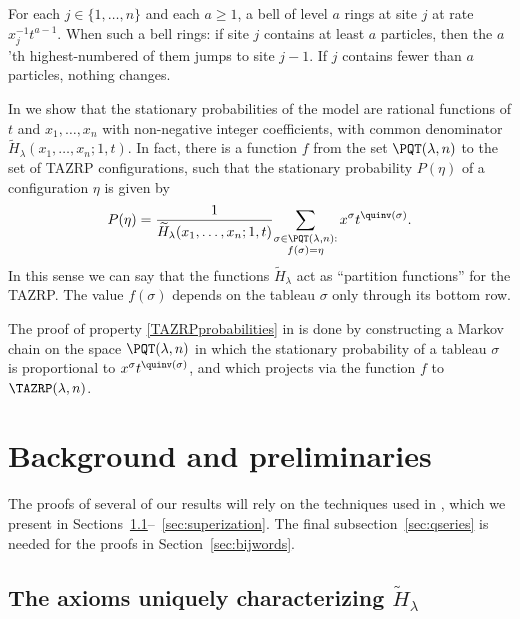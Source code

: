 For each $j\in\{1,\dots,n\}$ and each $a\geq 1$, a bell of level $a$ rings at site $j$ at rate
$x_j^{-1} t^{a-1}$. 
When such a bell rings: if site $j$ contains at least $a$ particles, 
then the $a$'th highest-numbered of them jumps to site $j-1$. If $j$ contains fewer
than $a$ particles, nothing changes. 


In \cite{AMM22} we show that 
the stationary probabilities of the model are rational functions of 
$t$ and $x_1, \dots, x_n$ with non-negative integer coefficients, with 
common denominator
$\widetilde{H}_{\lambda}(x_1,\ldots,x_n;1,t)$. 
In fact, there is a function $f$ from the set $\PQT(\lambda, n)$
to the set of TAZRP configurations, 
such that the stationary probability $P(\eta)$ of a configuration $\eta$ is given 
by
\begin{equation}\label{TAZRPprobabilities}
P(\eta)=
\frac{1}{
\widetilde{H}_{\lambda}(x_1,\ldots,x_n;1,t)
}
{
\sum_{
\substack{
\sigma\in\PQT(\lambda,n): 
\\
f(\sigma)=\eta
}
}
x^\sigma t^{\quinv(\sigma)}
}.
\end{equation}
In this sense we can say that the functions $\widetilde{H}_{\lambda}$ 
act as  ``partition functions'' for the TAZRP.
The value $f(\sigma)$ depends on the tableau $\sigma$ only through its bottom row. 

The proof of property \eqref{TAZRPprobabilities} in \cite{AMM22} is done by constructing a Markov chain on the space $\PQT(\lambda, n)$ in which the stationary probability of a tableau $\sigma$ is proportional to $x^\sigma t^{\quinv(\sigma)}$, and which projects via the function $f$ to $\TAZRP(\lambda,n)$. 


\section{Background and preliminaries}
\label{sec:background}

The proofs of several of our results will rely on the techniques used in \cite{HHL05}, which we present in Sections~\ref{sec:axioms}--~\ref{sec:superization}. The final subsection~\ref{sec:qseries} is needed for the proofs in Section~\ref{sec:bijwords}.

\subsection{The axioms uniquely characterizing $\widetilde{H}_{\lambda}$}\label{sec:axioms}


